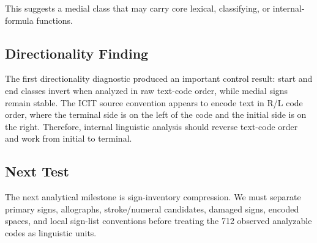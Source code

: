This suggests a medial class that may carry core lexical, classifying, or internal-formula functions.

\subsection{Directionality Finding}

The first directionality diagnostic produced an important control result: start and end classes invert when analyzed in raw text-code order, while medial signs remain stable. The ICIT source convention appears to encode text in R/L code order, where the terminal side is on the left of the code and the initial side is on the right. Therefore, internal linguistic analysis should reverse text-code order and work from initial to terminal.

\subsection{Next Test}

The next analytical milestone is sign-inventory compression. We must separate primary signs, allographs, stroke/numeral candidates, damaged signs, encoded spaces, and local sign-list conventions before treating the 712 observed analyzable codes as linguistic units.
